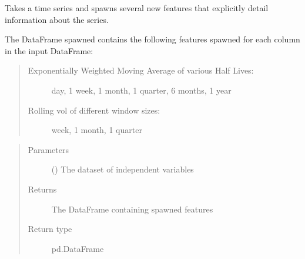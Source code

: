 \documentclass[letterpaper,10pt,english]{sphinxmanual}
\begin{document}
\begin{fulllineitems}
\label{\detokenize{preprocessing:Foresight.preprocessing.feature_spawn}}
Takes a time series and spawns several new features that explicitly
detail information about the series.

The DataFrame spawned contains the following features
spawned for each column in the input DataFrame:
\begin{quote}
\begin{description}
\item[{Exponentially Weighted Moving Average of various Half Lives:}]  day,
1 week,
1 month,
1 quarter,
6 months,
1 year

\item[{Rolling vol of different window sizes:}]  week,
1 month,
1 quarter

\end{description}
\end{quote}
\begin{quote}\begin{description}
\item[{Parameters}] \leavevmode
{} () \textendash{} The dataset of independent variables

\item[{Returns}] \leavevmode
The DataFrame containing spawned features

\item[{Return type}] \leavevmode
pd.DataFrame

\end{description}\end{quote}

\end{fulllineitems}

\end{document}
